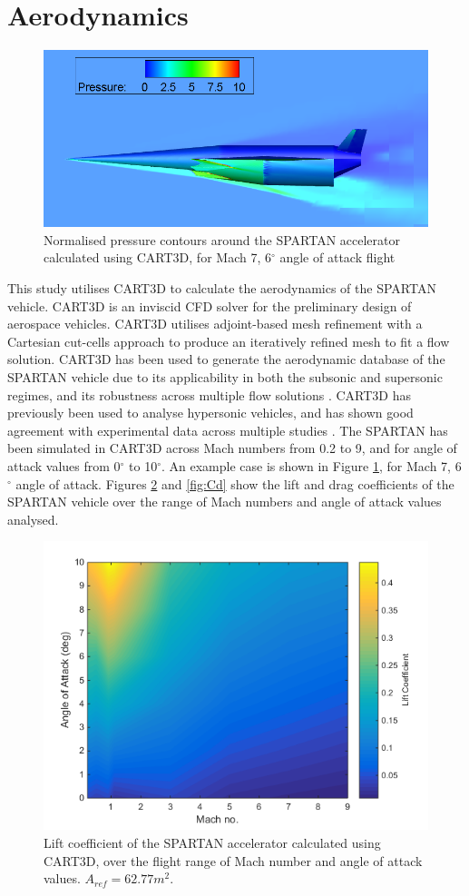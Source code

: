 \documentclass[journal]{new-aiaa} %
\begin{document}
\section{Aerodynamics}\label{sec:aero}

 \begin{figure}
 	\centering
 	\includegraphics[width=0.7\linewidth]{Figures/M7AoA6}
 	\caption{Normalised pressure contours around the SPARTAN accelerator calculated using CART3D, for Mach 7, 6$^\circ$ angle of attack flight}
 	\label{fig:M7AoA6}
 \end{figure}

 This study utilises CART3D to calculate the aerodynamics of the SPARTAN vehicle\cite{CART3D}. CART3D is an inviscid CFD solver for the preliminary design of aerospace vehicles. CART3D utilises adjoint-based mesh refinement with a Cartesian cut-cells approach to produce an iteratively refined mesh to fit a flow solution\cite{Aftosmis1997}. CART3D has been used to generate the aerodynamic database of the SPARTAN vehicle due to its applicability in both the subsonic and supersonic regimes, and its robustness across multiple flow solutions \cite{ForbesSpyratos2018}. CART3D has previously been used to analyse hypersonic vehicles, and has shown good agreement with experimental data across multiple studies \cite{Sagerman2017,Aftosmis2011}. The SPARTAN has been simulated in CART3D across Mach numbers from 0.2 to 9, and for angle of attack values from 0$^\circ$ to 10$^\circ$. An example case is shown in Figure \ref{fig:M7AoA6}, for Mach 7, 6$^\circ$ angle of attack. Figures \ref{fig:Cl} and \ref{fig:Cd} show the lift and drag coefficients of the SPARTAN vehicle over the range of Mach numbers and angle of attack values analysed. 
 
 
 
 
 \begin{figure}
 	\centering
 	\includegraphics[width=0.6\linewidth]{Figures/Cl}
 	\vspace{-10pt}
 	\caption{Lift coefficient of the SPARTAN accelerator calculated using CART3D, over the flight range of Mach number and angle of attack values. $A_{ref} = 62.77m^2$.}
 	\label{fig:Cl}
 \end{figure}
 
\end{document}
